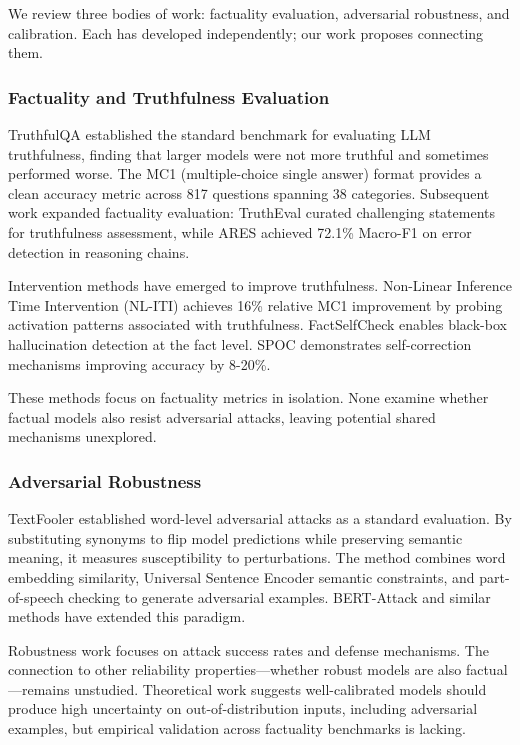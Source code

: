 
We review three bodies of work: factuality evaluation, adversarial robustness, and calibration. Each has developed independently; our work proposes connecting them.

\subsubsection{Factuality and Truthfulness Evaluation}

TruthfulQA established the standard benchmark for evaluating LLM truthfulness, finding that larger models were not more truthful and sometimes performed worse. The MC1 (multiple-choice single answer) format provides a clean accuracy metric across 817 questions spanning 38 categories. Subsequent work expanded factuality evaluation: TruthEval curated challenging statements for truthfulness assessment, while ARES achieved 72.1\% Macro-F1 on error detection in reasoning chains.

Intervention methods have emerged to improve truthfulness. Non-Linear Inference Time Intervention (NL-ITI) achieves 16\% relative MC1 improvement by probing activation patterns associated with truthfulness. FactSelfCheck enables black-box hallucination detection at the fact level. SPOC demonstrates self-correction mechanisms improving accuracy by 8-20\%.

These methods focus on factuality metrics in isolation. None examine whether factual models also resist adversarial attacks, leaving potential shared mechanisms unexplored.

\subsubsection{Adversarial Robustness}

TextFooler established word-level adversarial attacks as a standard evaluation. By substituting synonyms to flip model predictions while preserving semantic meaning, it measures susceptibility to perturbations. The method combines word embedding similarity, Universal Sentence Encoder semantic constraints, and part-of-speech checking to generate adversarial examples. BERT-Attack and similar methods have extended this paradigm.

Robustness work focuses on attack success rates and defense mechanisms. The connection to other reliability properties---whether robust models are also factual---remains unstudied. Theoretical work suggests well-calibrated models should produce high uncertainty on out-of-distribution inputs, including adversarial examples, but empirical validation across factuality benchmarks is lacking.

